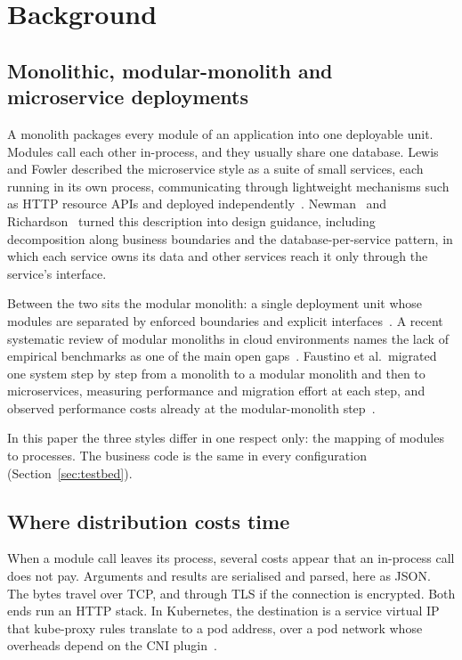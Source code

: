 \section{Background}
\label{sec:background}

\subsection{Monolithic, modular-monolith and microservice deployments}
\label{sec:bg-styles}

A monolith packages every module of an application into one deployable unit. Modules call each
other in-process, and they usually share one database. Lewis and Fowler described the
microservice style as a suite of small services, each running in its own process, communicating
through lightweight mechanisms such as HTTP resource APIs and deployed
independently~\cite{Fowler2014}. Newman~\cite{Newman2015} and Richardson~\cite{Richardson2018}
turned this description into design guidance, including decomposition along business boundaries and
the database-per-service pattern, in which each service owns its data and other services reach it
only through the service's interface.

Between the two sits the modular monolith: a single deployment unit whose modules are separated by
enforced boundaries and explicit interfaces~\cite{SuLi2024}. A recent systematic review of modular
monoliths in cloud environments names the lack of empirical benchmarks as one of the main open
gaps~\cite{AlQoran2025}. Faustino et al.\ migrated one system step by step from a monolith to a
modular monolith and then to microservices, measuring performance and migration effort at each
step, and observed performance costs already at the modular-monolith step~\cite{Faustino2024}.



In this paper the three styles differ in one respect only: the mapping of modules to processes.
The business code is the same in every configuration (Section~\ref{sec:testbed}).

\subsection{Where distribution costs time}
\label{sec:bg-costs}

When a module call leaves its process, several costs appear that an in-process call does not pay.
Arguments and results are serialised and parsed, here as JSON. The bytes travel over TCP, and
through TLS if the connection is encrypted. Both ends run an HTTP stack. In Kubernetes, the
destination is a service virtual IP that kube-proxy rules translate to a pod address, over a pod network whose
overheads depend on the CNI plugin~\cite{Qi2021}.

